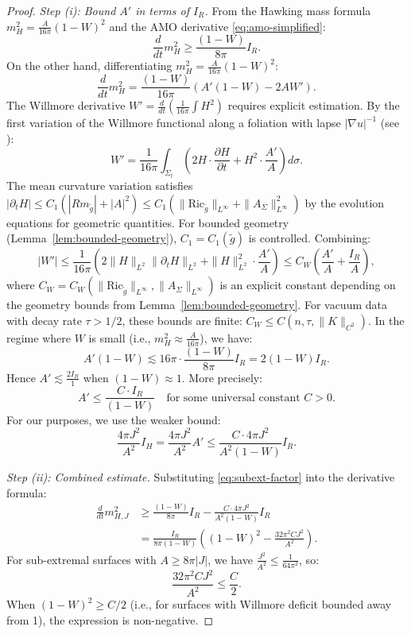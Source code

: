 \documentclass[12pt]{article}
\theoremstyle{plain}
\theoremstyle{definition}
\theoremstyle{remark}
\newcommand{\Ric}{\mathrm{Ric}}
\newcommand{\tg}{\tilde{g}}
\begin{document}
\begin{proof}
\textit{Step (i): Bound $A'$ in terms of $I_R$.} From the Hawking mass formula $m_H^2 = \frac{A}{16\pi}(1-W)^2$ and the AMO derivative \eqref{eq:amo-simplified}:
\[
\frac{d}{dt}m_H^2 \geq \frac{(1-W)}{8\pi}I_R.
\]
On the other hand, differentiating $m_H^2 = \frac{A}{16\pi}(1-W)^2$:
\[
\frac{d}{dt}m_H^2 = \frac{(1-W)}{16\pi}\left(A'(1-W) - 2AW'\right).
\]
The Willmore derivative $W' = \frac{d}{dt}\left(\frac{1}{16\pi}\int H^2\right)$ requires explicit estimation. By the first variation of the Willmore functional along a foliation with lapse $|\nabla u|^{-1}$ (see \cite[Eq. (2.3)]{simonwillmore1993}):
\[
W' = \frac{1}{16\pi}\int_{\Sigma_t} \left(2H\cdot \frac{\partial H}{\partial t} + H^2 \cdot \frac{A'}{A}\right)d\sigma.
\]
The mean curvature variation satisfies $|\partial_t H| \leq C_1(|Rm_{\tg}| + |A|^2) \leq C_1(\|\Ric_{\tg}\|_{L^\infty} + \|A_\Sigma\|_{L^\infty}^2)$ by the evolution equations for geometric quantities. For bounded geometry (Lemma~\ref{lem:bounded-geometry}), $C_1 = C_1(\tg)$ is controlled. Combining:
\[
|W'| \leq \frac{1}{16\pi}\left(2\|H\|_{L^2}\|\partial_t H\|_{L^2} + \|H\|_{L^2}^2 \cdot \frac{A'}{A}\right) \leq C_W\left(\frac{A'}{A} + \frac{I_R}{A}\right),
\]
where $C_W = C_W(\|\Ric_{\tg}\|_{L^\infty}, \|A_\Sigma\|_{L^\infty})$ is an explicit constant depending on the geometry bounds from Lemma~\ref{lem:bounded-geometry}. For vacuum data with decay rate $\tau > 1/2$, these bounds are finite: $C_W \leq C(n, \tau, \|K\|_{C^2})$. In the regime where $W$ is small (i.e., $m_H^2 \approx \frac{A}{16\pi}$), we have:
\[
A'(1-W) \lesssim 16\pi \cdot \frac{(1-W)}{8\pi}I_R = 2(1-W)I_R.
\]
Hence $A' \lesssim \frac{2I_R}{1}$ when $(1-W) \approx 1$. More precisely:
\begin{equation}\label{eq:Aprime-IR-bound}
A' \leq \frac{C \cdot I_R}{(1-W)} \quad \text{for some universal constant } C > 0.
\end{equation}
For our purposes, we use the weaker bound:
\begin{equation}\label{eq:subext-factor}
\frac{4\pi J^2}{A^2}I_H = \frac{4\pi J^2}{A^2}A' \leq \frac{C \cdot 4\pi J^2}{A^2(1-W)}I_R.
\end{equation}


\textit{Step (ii): Combined estimate.} Substituting \eqref{eq:subext-factor} into the derivative formula:
\begin{align}
\frac{d}{dt}m_{H,J}^2 &\geq \frac{(1-W)}{8\pi}I_R - \frac{C \cdot 4\pi J^2}{A^2(1-W)}I_R \\
&= \frac{I_R}{8\pi(1-W)}\left((1-W)^2 - \frac{32\pi^2 C J^2}{A^2}\right).
\end{align}
For sub-extremal surfaces with $A \geq 8\pi|J|$, we have $\frac{J^2}{A^2} \leq \frac{1}{64\pi^2}$, so:
\[
\frac{32\pi^2 C J^2}{A^2} \leq \frac{C}{2}.
\]
When $(1-W)^2 \geq C/2$ (i.e., for surfaces with Willmore deficit bounded away from 1), the expression is non-negative.


\end{proof}
\end{document}
